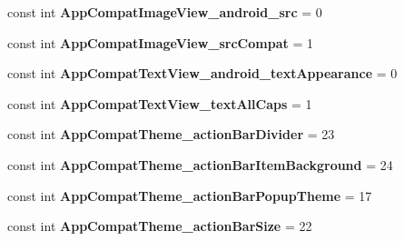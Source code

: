 \begin{DoxyCompactItemize}
const int {\bfseries App\+Compat\+Image\+View\+\_\+android\+\_\+src} = 0
\item 
\mbox{\label{class_pinned_app_1_1_droid_1_1_resource_1_1_styleable_a70cb3985310bc2b34300a28ef4d12cbe}} 
const int {\bfseries App\+Compat\+Image\+View\+\_\+src\+Compat} = 1
\item 
\mbox{\label{class_pinned_app_1_1_droid_1_1_resource_1_1_styleable_a17296167495d5883c41f9722580f249a}} 
const int {\bfseries App\+Compat\+Text\+View\+\_\+android\+\_\+text\+Appearance} = 0
\item 
\mbox{\label{class_pinned_app_1_1_droid_1_1_resource_1_1_styleable_a22105688a7bca287f8e02f092e8c95e3}} 
const int {\bfseries App\+Compat\+Text\+View\+\_\+text\+All\+Caps} = 1
\item 
\mbox{\label{class_pinned_app_1_1_droid_1_1_resource_1_1_styleable_a2ef4cba1bedb43dae9249586f8910aac}} 
const int {\bfseries App\+Compat\+Theme\+\_\+action\+Bar\+Divider} = 23
\item 
\mbox{\label{class_pinned_app_1_1_droid_1_1_resource_1_1_styleable_afb82e69682e588d9b56a1d7394510370}} 
const int {\bfseries App\+Compat\+Theme\+\_\+action\+Bar\+Item\+Background} = 24
\item 
\mbox{\label{class_pinned_app_1_1_droid_1_1_resource_1_1_styleable_a29b3d7f277a76ef5c457d7d6ed75c804}} 
const int {\bfseries App\+Compat\+Theme\+\_\+action\+Bar\+Popup\+Theme} = 17
\item 
\mbox{\label{class_pinned_app_1_1_droid_1_1_resource_1_1_styleable_aea0b12d97f4394cdb344a4d64bed7d0c}} 
const int {\bfseries App\+Compat\+Theme\+\_\+action\+Bar\+Size} = 22
\item 
\mbox{\label{class_pinned_app_1_1_droid_1_1_resource_1_1_styleable_aea259d9c4c76855290f7ef905ae18aaf}} 

\end{DoxyCompactItemize}
